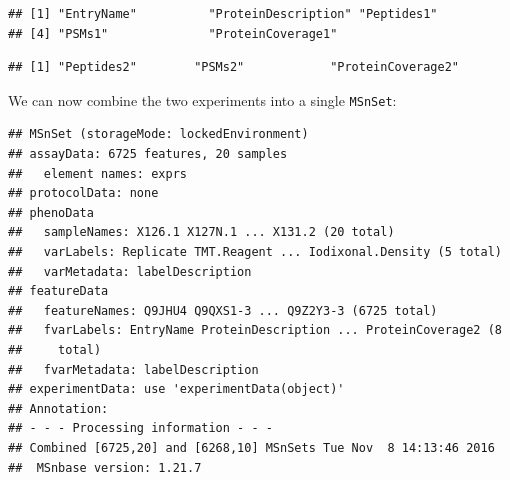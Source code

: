 \begin{knitrout}
\color{fgcolor}\begin{kframe}
\begin{alltt}
\hlstd{(hyperLOPIT2015ms3r1)[}\hlopt{:}\hlstd{]} \hlkwb{<-} \hlstd{(}\hlstd{(hyperLOPIT2015ms3r1)[}\hlopt{:}\hlstd{],} \hlstd{)}
\hlstd{(hyperLOPIT2015ms3r2)[}\hlopt{:}\hlstd{]} \hlkwb{<-} \hlstd{(}\hlstd{(hyperLOPIT2015ms3r2)[}\hlopt{:}\hlstd{],} \hlstd{)}
 \hlkwb{<-} \hlstd{(hyperLOPIT2015ms3r1)[}\hlopt{:}\hlstd{]}
 \hlkwb{<-} \hlstd{(hyperLOPIT2015ms3r2)[}\hlopt{:}\hlstd{]}
\end{alltt}
\begin{verbatim}
## [1] "EntryName"          "ProteinDescription" "Peptides1"         
## [4] "PSMs1"              "ProteinCoverage1"
\end{verbatim}
\begin{alltt}
\end{alltt}
\begin{verbatim}
## [1] "Peptides2"        "PSMs2"            "ProteinCoverage2"
\end{verbatim}
\end{kframe}
\end{knitrout}

We can now combine the two experiments into a single \texttt{MSnSet}:

\begin{knitrout}
\color{fgcolor}\begin{kframe}
\begin{alltt}
 \hlkwb{<-} 
\end{alltt}
\begin{verbatim}
## MSnSet (storageMode: lockedEnvironment)
## assayData: 6725 features, 20 samples 
##   element names: exprs 
## protocolData: none
## phenoData
##   sampleNames: X126.1 X127N.1 ... X131.2 (20 total)
##   varLabels: Replicate TMT.Reagent ... Iodixonal.Density (5 total)
##   varMetadata: labelDescription
## featureData
##   featureNames: Q9JHU4 Q9QXS1-3 ... Q9Z2Y3-3 (6725 total)
##   fvarLabels: EntryName ProteinDescription ... ProteinCoverage2 (8
##     total)
##   fvarMetadata: labelDescription
## experimentData: use 'experimentData(object)'
## Annotation:  
## - - - Processing information - - -
## Combined [6725,20] and [6268,10] MSnSets Tue Nov  8 14:13:46 2016 
##  MSnbase version: 1.21.7
\end{verbatim}
\end{kframe}
\end{knitrout}

